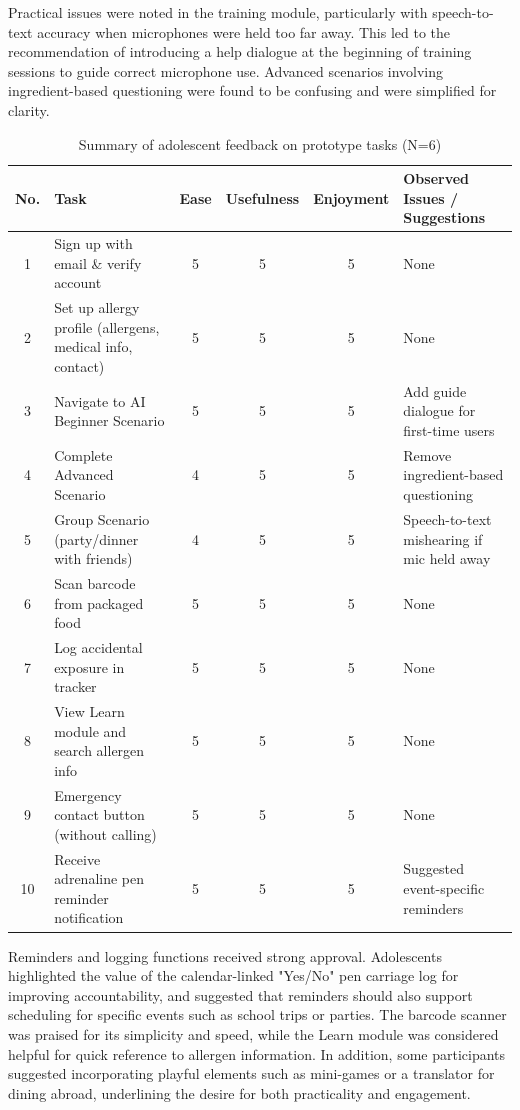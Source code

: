 \documentclass[MScCS]{uccthesis}
\begin{document}
Practical issues were noted in the training module, particularly with speech-to-text accuracy when microphones were held too far away. This led to the recommendation of introducing a help dialogue at the beginning of training sessions to guide correct microphone use. Advanced scenarios involving ingredient-based questioning were found to be confusing and were simplified for clarity.  


\begin{table}[htbp]
\centering
\small
\caption{Summary of adolescent feedback on prototype tasks (N=6)}
\label{tab:ppi-feedback}
\renewcommand{\arraystretch}{1.3}
\begin{tabularx}{\textwidth}{|c|X|c|c|c|X|}
\hline
\textbf{No.} & \textbf{Task} & \textbf{Ease} & \textbf{Usefulness} & \textbf{Enjoyment} & \textbf{Observed Issues / Suggestions} \\
\hline
1 & Sign up with email \& verify account & 5 & 5 & 5 & None \\
2 & Set up allergy profile (allergens, medical info, contact) & 5 & 5 & 5 & None \\
3 & Navigate to AI Beginner Scenario & 5 & 5 & 5 & Add guide dialogue for first-time users \\
4 & Complete Advanced Scenario & 4 & 5 & 5 & Remove ingredient-based questioning \\
5 & Group Scenario (party/dinner with friends) & 4 & 5 & 5 & Speech-to-text mishearing if mic held away \\
6 & Scan barcode from packaged food & 5 & 5 & 5 & None \\
7 & Log accidental exposure in tracker & 5 & 5 & 5 & None \\
8 & View Learn module and search allergen info & 5 & 5 & 5 & None \\
9 & Emergency contact button (without calling) & 5 & 5 & 5 & None \\
10 & Receive adrenaline pen reminder notification & 5 & 5 & 5 & Suggested event-specific reminders \\
\hline
\end{tabularx}
\end{table}


Reminders and logging functions received strong approval. Adolescents highlighted the value of the calendar-linked "Yes/No" pen carriage log for improving accountability, and suggested that reminders should also support scheduling for specific events such as school trips or parties. The barcode scanner was praised for its simplicity and speed, while the Learn module was considered helpful for quick reference to allergen information. In addition, some participants suggested incorporating playful elements such as mini-games or a translator for dining abroad, underlining the desire for both practicality and engagement.
\end{document}
